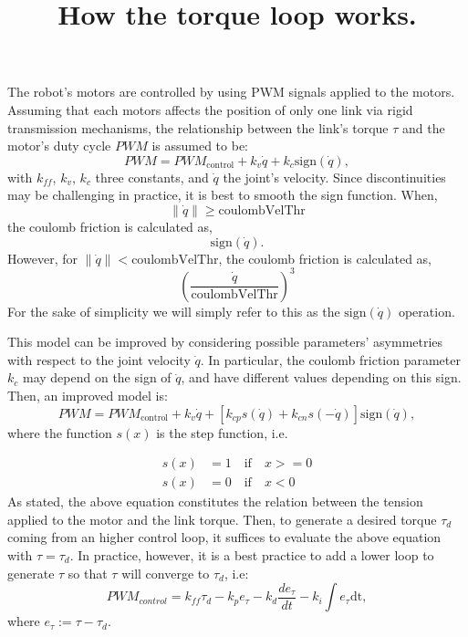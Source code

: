 \documentclass{article}
\begin{document}
\title{How the torque loop works.}
\maketitle



The robot's motors are controlled by using PWM signals applied to the motors. Assuming that each motors affects the position of only one link via rigid transmission mechanisms, the relationship between the link's torque $ \tau $ and the motor's duty cycle $ PWM $ is assumed to be:
\begin{equation}
  PWM  = {PWM}_{\text{control}} + k_v \dot{q} + k_c \mbox{sign}(\dot{q}),
\end{equation}
with $k_{ff}$, $k_v$, $k_c$ three constants, and $\dot{q}$ the joint's velocity.
Since discontinuities may be challenging in practice, it is best to smooth the sign function. When,
\begin{equation}
\|\dot{q}\| \geq \text{coulombVelThr}
\end{equation}
the coulomb friction is calculated as,
\begin{equation}
\mbox{sign}(\dot{q}).
\end{equation}
However, for $\|\dot{q}\| < \text{coulombVelThr}$, the coulomb friction is calculated as,
\begin{equation}
\left(\frac{\dot{q}}{\text{coulombVelThr}}\right)^3
\end{equation}
For the sake of simplicity we will simply refer to this as the $\mbox{sign}(\dot{q})$ operation.

This model can be improved by considering possible parameters' asymmetries with respect to the joint velocity $\dot{q}$.
In particular, the coulomb friction parameter  $k_c$ may depend on the sign of $\dot{q}$, and have different
values depending on this sign. Then, an improved model is:
\begin{equation}
  PWM  = {PWM}_{\text{control}} + k_{v} \dot{q} + [k_{cp} s(\dot{q}) + k_{cn} s(-\dot{q})] \mbox{sign}(\dot{q}),
\end{equation}
where the function $s(x)$ is the step function, i.e.

\begin{align}
    s(x) &=  1 \quad \mbox{if} \quad x >= 0 \\
    s(x) &=  0 \quad \mbox{if} \quad x < 0
\end{align}
%
As stated, the above equation constitutes the relation between the tension applied to the motor and the link torque.
Then, to generate a desired torque $\tau_d$ coming from an higher control loop, it suffices to evaluate the above equation
with $\tau = \tau_d$. In practice, however, it is a best practice to add a lower loop to generate $\tau$ so that $\tau$
will converge to $\tau_d$, i.e:
\begin{equation}
  {PWM}_{control} = k_{ff} \tau_d - k_p e_{\tau} - k_d \frac{de_{\tau}}{dt} - k_i \int e_{\tau} \mbox{dt},
\end{equation}
%
where $e_{\tau} := \tau - \tau_{d}$.
\end{document}
